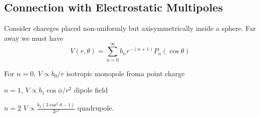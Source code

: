 \documentclass[a4paper]{article}
\begin{document}
\subsection{Connection with Electrostatic Multipoles}

Consider chareges placed non-uniformly but axisymmetrically inside a sphere. Far away we must have
\[
  V(r, \theta) = \sum_{n = 0}^{\infty} b_n r^{-(n + 1)} P_n(\cos \theta)
\]

For \(n = 0\), \(V \propto b_0/r\) isotropic monopole froma point charge

\(n = 1\), \(V \propto b_1 \cos \phi/r^2\) dipole field

\(n = 2\) \(V \propto \frac{b_2(3 \cos^2 \theta - 1)}{2r^3}\) quadrupole.
\end{document}
